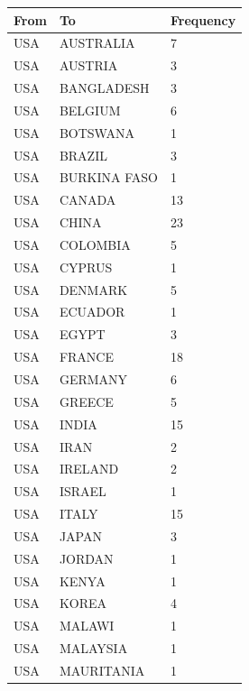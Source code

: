 \begin{longtable}{|l|l|l|}
\hline
From & To             & Frequency \\ \hline
\endfirsthead
%
\endhead
%
\hline
\endfoot
%
\endlastfoot
%
USA  & AUSTRALIA      & 7         \\
USA  & AUSTRIA        & 3         \\
USA  & BANGLADESH     & 3         \\
USA  & BELGIUM        & 6         \\
USA  & BOTSWANA       & 1         \\
USA  & BRAZIL         & 3         \\
USA  & BURKINA FASO   & 1         \\
USA  & CANADA         & 13        \\
USA  & CHINA          & 23        \\
USA  & COLOMBIA       & 5         \\
USA  & CYPRUS         & 1         \\
USA  & DENMARK        & 5         \\
USA  & ECUADOR        & 1         \\
USA  & EGYPT          & 3         \\
USA  & FRANCE         & 18        \\
USA  & GERMANY        & 6         \\
USA  & GREECE         & 5         \\
USA  & INDIA          & 15        \\
USA  & IRAN           & 2         \\
USA  & IRELAND        & 2         \\
USA  & ISRAEL         & 1         \\
USA  & ITALY          & 15        \\
USA  & JAPAN          & 3         \\
USA  & JORDAN         & 1         \\
USA  & KENYA          & 1         \\
USA  & KOREA          & 4         \\
USA  & MALAWI         & 1         \\
USA  & MALAYSIA       & 1         \\
USA  & MAURITANIA     & 1         \\

\end{longtable}
